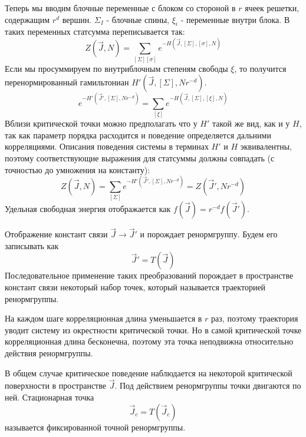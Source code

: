 \documentclass[a4paper,12pt]{article}
\theoremstyle{definition}
\theoremstyle{definition}
\theoremstyle{definition}
\begin{document}
Теперь мы вводим блочные переменные с блоком со стороной в $r$ ячеек решетки, содержащим $r^d$ вершин. $\Sigma_I$ - блочные спины, $\xi_i$ - переменные внутри блока. В таких переменных статсумма переписывается так:
\begin{equation}
  \label{eq:57}
  Z(\vec J,N)=\sum_{[\Sigma][\sigma]}e^{-H(\vec J,[\Sigma],[\sigma],N)}
\end{equation}
Если мы просуммируем по внутриблочным степеням свободы $\xi$, то получится перенормированный гамильтониан $H'(\vec J,[\Sigma],Nr^{-d})$.
\begin{equation}
  \label{eq:58}
  e^{-H'(\vec J',[\Sigma],Nr^{-d})}=\sum_{[\xi]}e^{-H(\vec J,[\Sigma],[\xi],N)}
\end{equation}
Вблизи критической точки можно предполагать что у $H'$ такой же вид, как и у $H$, так как параметр порядка расходится и поведение определяется дальними корреляциями. Описания поведения системы в терминах $H'$ и $H$ эквивалентны, поэтому соответствующие выражения для статсуммы должны совпадать (с точностью до умножения на константу):
\begin{equation}
\label{eq:52}
  Z(\vec J,N)=\sum_{[\Sigma]}e^{-H'(\vec J',[\Sigma],Nr^{-d})}=Z(\vec J',Nr^{-d})
\end{equation}
Удельная свободная энергия отображается как $f(\vec J)=r^{-d} f(\vec J')$.

Отображение констант связи $\vec J\to\vec J'$ и порождает ренормгруппу. Будем его записывать как
\begin{equation}
  \label{eq:53}
  \vec J'=T(\vec J)
\end{equation}
Последовательное применение таких преобразований порождает в пространстве констант связи некоторый набор точек, который называется траекторией ренормгруппы.

На каждом шаге корреляционная длина уменьшается в $r$ раз, поэтому траектория уводит систему из окрестности критической точки. Но в самой критической точке корреляционная длина бесконечна, поэтому эта точка неподвижна относительно действия ренормгруппы. 

В общем случае критическое поведение наблюдается на некоторой критической поверхности в пространстве $\vec J$. Под действием ренормгруппы точки двигаются по ней. Стационарная точка
\begin{equation}
  \label{eq:54}
  \vec J_c=T(\vec J_c)
\end{equation}
называется фиксированной точной ренормгруппы.
\end{document}
